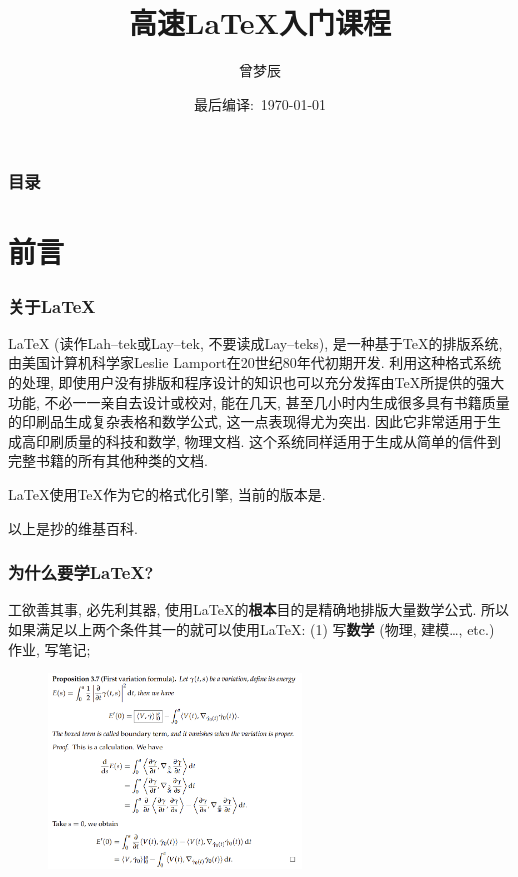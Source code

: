 \documentclass{beamer}
\title{高速\LaTeX{}入门课程}
\author{曾梦辰}
\institute{北京师范大学OM学社}
\date{最后编译:\ \today}
\begin{document}
\maketitle

\begin{frame}
    \frametitle{目录}
    \tableofcontents
\end{frame}

\section{前言}

\begin{frame}
    \frametitle{关于\LaTeX{}}
    LaTeX (读作Lah--tek或Lay--tek, 不要读成Lay--teks), 是一种基于TeX的排版系统, 由美国计算机科学家Leslie Lamport在20世纪80年代初期开发.
    利用这种格式系统的处理, 即使用户没有排版和程序设计的知识也可以充分发挥由TeX所提供的强大功能, 不必一一亲自去设计或校对, 能在几天, 甚至几小时内生成很多具有书籍质量的印刷品生成复杂表格和数学公式, 这一点表现得尤为突出.
    因此它非常适用于生成高印刷质量的科技和数学, 物理文档.
    这个系统同样适用于生成从简单的信件到完整书籍的所有其他种类的文档.

    LaTeX使用TeX作为它的格式化引擎, 当前的版本是\LaTeXe.\pause

    \vspace{1cm}
    以上是抄的维基百科.
\end{frame}

\begin{frame}
    \frametitle{为什么要学\LaTeX{}?}
    工欲善其事, 必先利其器, 使用\LaTeX{}的\textbf{根本}目的是精确地排版大量数学公式.
    所以如果满足以上两个条件其一的就可以使用\LaTeX{}:\pause
    (1) 写\textbf{数学} (物理, 建模\dots, etc.) 作业, 写笔记;
    \begin{figure}[h]
        \centering
        \includegraphics[width=0.6\textwidth]{figure/first-variation.png}
    \end{figure} 
\end{frame}
\end{document}
